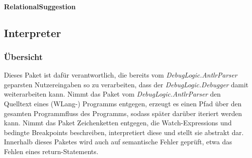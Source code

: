 \documentclass[parskip=full]{scrartcl}
\begin{document}
\paragraph{RelationalSuggestion}

\subsection{Interpreter}
\subsubsection{Übersicht}
Dieses Paket ist dafür verantwortlich, die bereits vom \textit{DebugLogic.AntlrParser}  geparsten Nutzereingaben so zu verarbeiten, dass der \textit{DebugLogic.Debugger} damit weiterarbeiten kann. Nimmt das Paket vom \textit{DebugLogic.AntlrParser} den Quelltext eines (WLang-) Programms entgegen, erzeugt es einen Pfad über den gesamten Programmfluss des Programms, sodass später darüber iteriert werden kann. Nimmt das Paket Zeichenketten entgegen, die Watch-Expressions und bedingte Breakpoints beschreiben, interpretiert diese und stellt sie abstrakt dar.
Innerhalb dieses Paketes wird auch auf semantische Fehler geprüft, etwa das Fehlen eines return-Statements.
\end{document}
